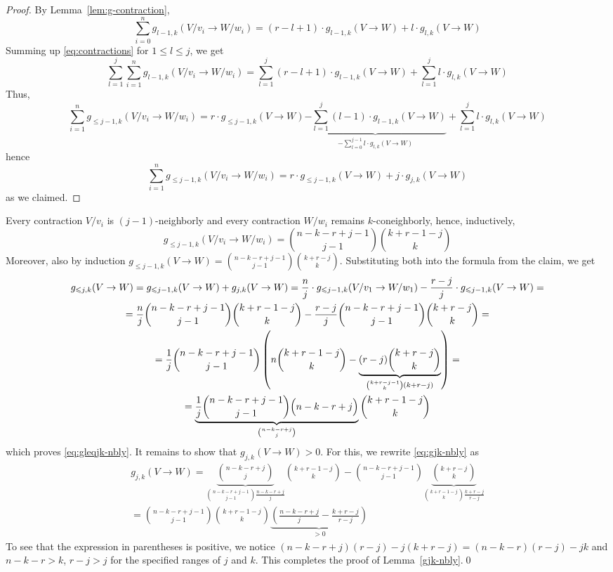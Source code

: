 \documentclass[11pt]{article}
\renewcommand{\leq}{\leqslant}
\begin{document}
\begin{proof}
By Lemma~\ref{lem:g-contraction},
\begin{equation}
\label{eq:contractions}
\sum_{i=0}^n g_{l-1,k}(V/v_i\to W/w_i) = (r-l+1) \cdot g_{l-1,k}(V\to W) + l \cdot g_{l,k}(V\to W)
\end{equation}
Summing up \eqref{eq:contractions} for $1 \leq l \leq j$, we get
\[ \sum_{l=1}^j \sum_{i=1}^n g_{l-1,k}(V/v_i\to W/w_i) = \sum_{l=1}^j (r-l+1) \cdot g_{l-1,k}(V\to W) + \sum_{l=1}^j l \cdot g_{l,k}(V \to W) \]
Thus,
\[ \sum_{i=1}^n g_{\leq j-1, k}(V/v_i\to W/w_i) = r \cdot g_{\leq j-1, k}(V \to W) \underbrace{ - \sum_{l=1}^j (l-1) \cdot g_{l-1,k}(V \to W)}_{-\sum_{l=0}^{j-1} l \cdot g_{l,k}(V \to W)} + \sum_{l=1}^j l \cdot g_{l,k}(V \to W)\]
hence
\begin{equation}
\label{eq:}
\sum_{i=1}^n g_{\leq j-1, k}(V/v_i\to W/w_i) = r \cdot g_{\leq j-1, k}(V \to W) + j \cdot g_{j,k}(V \to W)
\end{equation}
as we claimed.
\end{proof}
Every contraction $V/v_i$ is $(j-1)$-neighborly and every contraction $W/w_i$ remains $k$-coneighborly, hence, inductively,
\[ g_{\leq j-1, k} (V/v_i\to W/w_i) = \binom{n-k-r+j-1}{j-1} \binom{k+r-1-j}{k} \]
Moreover, also by induction $g_{\leq j-1, k}(V \to W) = \binom{n-k-r+j-1}{j-1} \binom{k+r-j}{k}$.
%
Substituting both into the formula from the claim, we get
\begin{multline}
g_{\leq j,k} (V \to W) = g_{\leq j-1,k} (V \to W) + g_{j,k}(V \to W) = \dfrac{n}{j} \cdot g_{\leq j-1,k} (V/v_1 \to W/w_1) - \dfrac{r-j}{j} \cdot g_{\leq j-1,k} (V \to W) = \\
= \dfrac{n}{j} \binom{n-k-r+j-1}{j-1} \binom{k+r-1-j}{k} - \frac{r-j}{j} \binom{n-k-r+j-1}{j-1} \binom{k+r-j}{k} = \\
= \dfrac{1}{j} \binom{n-k-r+j-1}{j-1} \left( n \binom{k+r-1-j}{k} - \underbrace{(r-j)\binom{k+r-j}{k}}_{\binom{k+r-j-1}{k}(k+r-j)} \right) = \\
= \underbrace{\dfrac{1}{j} \binom{n-k-r+j-1}{j-1} \Bigl( n-k-r+j \Bigr)}_{\binom{n-k-r+j}{j}}\binom{k+r-1-j}{k}
\end{multline}
which proves \eqref{eq:gleqjk-nbly}.
%
It remains to show that $g_{j,k}(V \to W) > 0$. For this, we rewrite \eqref{eq:gjk-nbly} as
%
\begin{multline}
g_{j,k}(V \to W)=\underbrace{\binom{n-k-r+j}{j}}_{\binom{n-k-r+j-1}{j-1} \frac{n-k-r+j}{j}}\binom{k+r-1-j}{k} - \binom{n-k-r+j-1}{j-1} \underbrace{\binom{k+r-j}{k}}_{\binom{k+r-1-j}{k} \frac{k+r-j}{r-j}}  \\
= \binom{n-k-r+j-1}{j-1} \binom{k+r-1-j}{k} \underbrace{ \left( \frac{n-k-r+j}{j} - \frac{k+r-j}{r-j} \right)}_{>0}
\end{multline}
%
To see that the expression in parentheses is positive, we notice $(n-k-r+j)(r-j) - j (k+r-j) = (n-k-r)(r-j)-jk$ and $n-k-r > k$, $r-j > j$ for the specified ranges of $j$ and $k$.
This completes the proof of Lemma~\ref{gjk-nbly}.\qed
%
\end{document}
